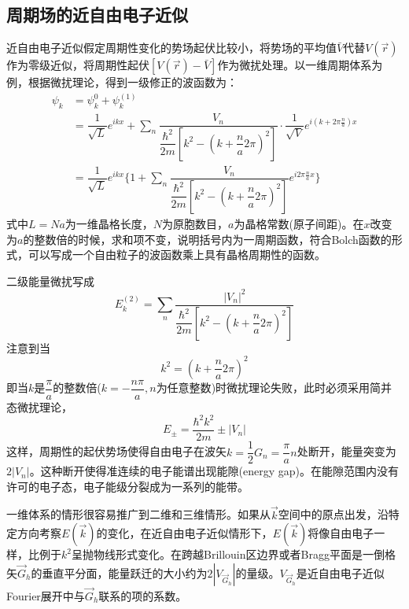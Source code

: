 \subsection{周期场的近自由电子近似}
近自由电子近似假定周期性变化的势场起伏比较小，将势场的平均值$\bar V$代替$V(\vec r)$作为零级近似，将周期性起伏$[V(\vec r)-\bar
V]$作为微扰处理。以一维周期体系为例，根据微扰理论，得到一级修正的波函数为：
\begin{equation}
  \begin{aligned}
    \psi_k&=\psi_k^0+\psi_k^{(1)} \\
    &=\dfrac1{\sqrt L}e^{ikx}+\sum_n\dfrac{V_n}{\dfrac{\hbar^2}{2m}\left[k^2-\left(k+\dfrac na2\pi\right)^2\right]}\cdot\dfrac1{\sqrt V}e^{i(k+2\pi\frac na)x} \\
    &=\dfrac1{\sqrt L}e^{ikx}\biggl\{1+\sum_n\dfrac{V_n}{\dfrac{\hbar^2}{2m}\left[k^2-\left(k+\dfrac na2\pi\right)^2\right]}e^{i2\pi\frac nax}\biggr\}
  \end{aligned}
  \label{eq:solid-40}
\end{equation}
式中$L=Na$为一维晶格长度，$N$为原胞数目，$a$为晶格常数(原子间距)。在$x$改变为$a$的整数倍的时候，求和项不变，说明括号内为一周期函数，符合Bolch函数的形式，可以写成一个自由粒子的波函数乘上具有晶格周期性的函数。


二级能量微扰写成
\begin{equation}
  E_k^{(2)}=\sum_n\dfrac{|V_n|^2}{\dfrac{\hbar^2}{2m}\left[k^2-\left(k+\dfrac na2\pi\right)^2\right]}
  \label{eq:solid-41}
\end{equation}
注意到当
\begin{equation}
  k^2=\left(k+\dfrac na2\pi\right)^2
  \label{eq:solid-42}
\end{equation}
即当$k$是$\dfrac{\pi}a$的整数倍($k=-\dfrac{n\pi}a,n\mbox{为任意整数}$)时微扰理论失败，此时必须采用简并态微扰理论，
\begin{equation}
  E_{\pm}=\dfrac{\hbar^2k^2}{2m}\pm|V_n|
  \label{eq:solid-43}
\end{equation}
这样，周期性的起伏势场使得自由电子在波矢$k=\dfrac12G_n=\dfrac{\pi}an$处断开，能量突变为$2|V_n|$。这种断开使得准连续的电子能谱出现能隙(energy gap)。在能隙范围内没有许可的电子态，电子能级分裂成为一系列的能带。


一维体系的情形很容易推广到二维和三维情形。如果从$\vec k$空间中的原点出发，沿特定方向考察$E(\vec k)$的变化，在近自由电子近似情形下，$E(\vec k)$将像自由电子一样，比例于$k^2$呈抛物线形式变化。在跨越Brillouin区边界或者Bragg平面是一倒格矢$\vec G_h$的垂直平分面，能量跃迁的大小约为$2|V_{\vec G_h}|$的量级。$V_{\vec G_h}$是近自由电子近似Fourier展开中与$\vec G_h$联系的项的系数。

